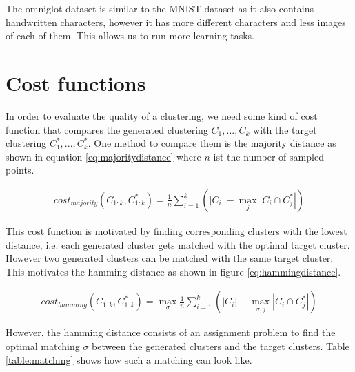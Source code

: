 The omniglot dataset is similar to the MNIST dataset as it also contains handwritten characters, however it has more different characters and less images of each of them. This allows us to run more learning tasks.

\section{Cost functions}
\label{chapter:costfunctions}

In order to evaluate the quality of a clustering, we need some kind of cost function that compares the generated clustering $C_1,...,C_k$ with the target clustering $C_1^*, ..., C_k^*$. One method to compare them is the majority distance as shown in equation \ref{eq:majoritydistance} where $n$ ist the number of sampled points.

\begin{equation}
    \begin{aligned}
        cost_{majority}(C_{1:k}, C_{1:k}^*) = \frac{1}{n} \sum\limits_{i=1}^{k} (|C_i| - \max\limits_j |C_i \cap C_j^*|)
    \end{aligned}
    \label{eq:majoritydistance}
\end{equation}

This cost function is motivated by finding corresponding clusters with the lowest distance, i.e. each generated cluster gets matched with the optimal target cluster. However two generated clusters can be matched with the same target cluster. This motivates the hamming distance as shown in figure \ref{eq:hammingdistance}.

\begin{equation}
    \begin{aligned}
        cost_{hamming}(C_{1:k}, C_{1:k}^*) = \max\limits_{\sigma} \frac{1}{n} \sum\limits_{i=1}^{k} (|C_i| - \max\limits_{\sigma, j} |C_i \cap C_j^*|)
    \end{aligned}
    \label{eq:hammingdistance}
\end{equation}

However, the hamming distance consists of an assignment problem to find the optimal matching $\sigma$ between the generated clusters and the target clusters. Table \ref{table:matching} shows how such a matching can look like.

